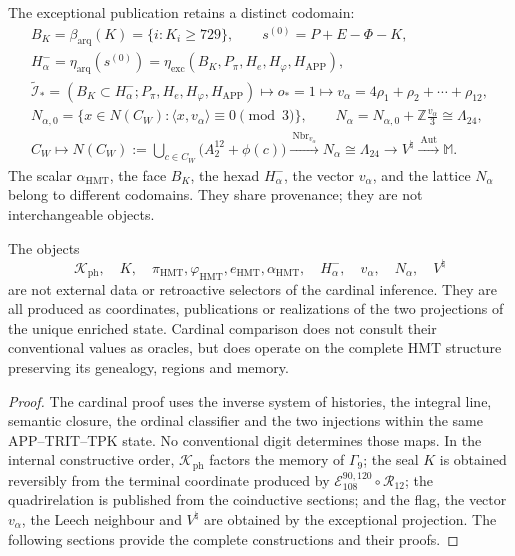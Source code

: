 The exceptional publication retains a distinct codomain:
\[
 \begin{gathered}
 B_K=\beta_{\mathrm{arq}}(K)=\{i:K_i\ge729\},\qquad
 s^{(0)}=P+E-\Phi-K,\\
 H^-_\alpha=\eta_{\mathrm{arq}}(s^{(0)})
 =\eta_{\mathrm{exc}}(B_K,P_\pi,H_e,H_\varphi,H_{\mathrm{APP}}),\\
 \widetilde{\mathcal I}_*
 =(B_K\subset H^-_\alpha;P_\pi,H_e,H_\varphi,H_{\mathrm{APP}})
 \longmapsto o_*=1
 \longmapsto v_\alpha=4\rho_1+\rho_2+\cdots+\rho_{12},\\
 N_{\alpha,0}
 =\{x\in N(C_W):\langle x,v_\alpha\rangle\equiv0\pmod3\},\qquad
 N_\alpha=N_{\alpha,0}+\mathbb Z\frac{v_\alpha}{3}\cong\Lambda_{24},\\
 C_W\longmapsto
 N(C_W):=\bigcup_{c\in C_W}\bigl(A_2^{12}+\phi(c)\bigr)
 \xrightarrow{\ \operatorname{Nbr}_{v_\alpha}\ }
 N_\alpha\cong\Lambda_{24}
 \longrightarrow V^\natural
 \xrightarrow{\ \operatorname{Aut}\ }\mathbb M.
 \end{gathered}
\]
The scalar \(\alpha_{\mathrm{HMT}}\), the face \(B_K\), the hexad
\(H^-_\alpha\), the vector \(v_\alpha\), and the lattice \(N_\alpha\)
belong to different codomains. They share provenance; they are not
interchangeable objects.

\begin{proposition}
\label{ix:prop:posterioridad-testigos-ch}
The objects
\[
 \mathcal K_{\mathrm{ph}},\quad K,\quad
 \pi_{\mathrm{HMT}},\varphi_{\mathrm{HMT}},e_{\mathrm{HMT}},
 \alpha_{\mathrm{HMT}},\quad H^-_\alpha,\quad v_\alpha,\quad
 N_\alpha,\quad V^\natural
\]
are not external data or retroactive selectors of the cardinal inference.
They are all produced as coordinates, publications or realizations of the two
projections of the unique enriched state. Cardinal comparison does not consult
their conventional values as oracles, but does operate on the complete HMT
structure preserving its genealogy, regions and memory.
\end{proposition}

\begin{proof}
The cardinal proof uses the inverse system of histories, the integral
line, semantic closure, the ordinal classifier and the two injections
within the same APP--TRIT--TPK state. No conventional digit determines
those maps. In the internal constructive order,
\(\mathcal K_{\mathrm{ph}}\) factors the memory of \(\Gamma_9\); the seal
\(K\) is obtained reversibly from the terminal coordinate produced by
\(\mathcal E_{108}^{90,120}\circ\mathcal R_{12}\); the
quadrirelation is published from the coinductive sections; and the flag, the
vector \(v_\alpha\), the Leech neighbour and \(V^\natural\) are obtained by the
exceptional projection. The following sections provide the
complete constructions and their proofs.
\end{proof}

